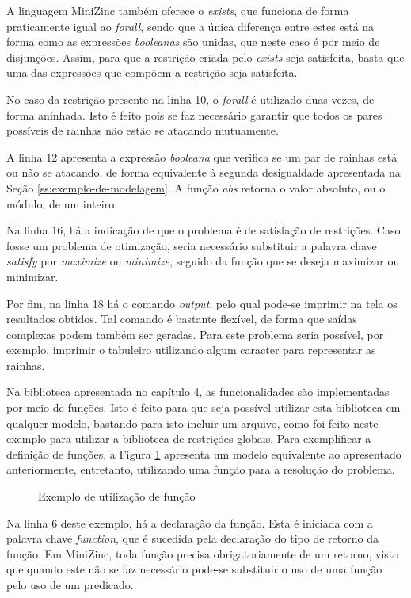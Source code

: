 A linguagem MiniZinc também oferece o \textit{exists}, que funciona de forma praticamente igual ao \textit{forall}, sendo que a única diferença entre estes está na forma como as expressões \textit{booleanas} são unidas, que neste caso é por meio de disjunções. Assim, para que a restrição criada pelo \textit{exists} seja satisfeita, basta que uma das expressões que compõem a restrição seja satisfeita.

No caso da restrição presente na linha 10, o \textit{forall} é utilizado duas vezes, de forma aninhada. Isto é feito pois se faz necessário garantir que todos os pares possíveis de rainhas não estão se atacando mutuamente.

A linha 12 apresenta a expressão \textit{booleana} que verifica se um par de rainhas está ou não se atacando, de forma equivalente à segunda desigualdade apresentada na Seção \ref{ss:exemplo-de-modelagem}. A função \textit{abs} retorna o valor absoluto, ou o módulo, de um inteiro.

Na linha 16, há a indicação de que o problema é de satisfação de restrições. Caso fosse um problema de otimização, seria necessário substituir a palavra chave \textit{satisfy} por \textit{maximize} ou \textit{minimize}, seguido da função que se deseja maximizar ou minimizar.

Por fim, na linha 18 há o comando \textit{output}, pelo qual pode-se imprimir na tela os resultados obtidos. Tal comando é bastante flexível, de forma que saídas complexas podem também ser geradas. Para este problema seria possível, por exemplo, imprimir o tabuleiro utilizando algum caracter para representar as rainhas.

Na biblioteca apresentada no capítulo 4, as funcionalidades são implementadas por meio de funções. Isto é feito para que seja possível utilizar esta biblioteca em qualquer modelo, bastando para isto incluir um arquivo, como foi feito neste exemplo para utilizar a biblioteca de restrições globais. Para exemplificar a definição de funções, a Figura \ref{code:nqueens} apresenta um modelo equivalente ao apresentado anteriormente, entretanto, utilizando uma função para a resolução do problema.

\begin{figure}[!ht]
  \centering
  \caption{Exemplo de utilização de função}
  \label{code:nqueens}
  
\end{figure}

Na linha 6 deste exemplo, há a declaração da função. Esta é iniciada com a palavra chave \textit{function}, que é sucedida pela declaração do tipo de retorno da função. Em MiniZinc, toda função precisa obrigatoriamente de um retorno, visto que quando este não se faz necessário pode-se substituir o uso de uma função pelo uso de um predicado.

